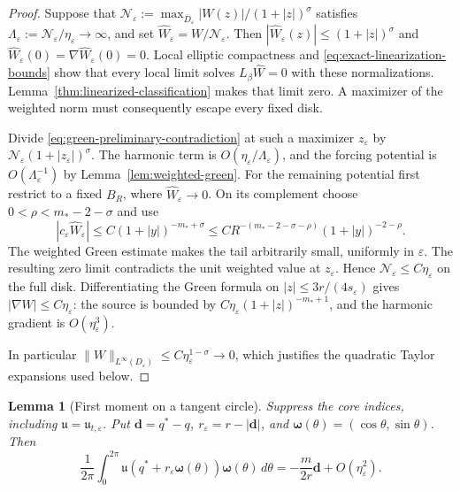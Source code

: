 \documentclass[11pt,reqno]{amsart}
\numberwithin{equation}{section}
\newtheorem{lemma}[theorem]{Lemma}
\theoremstyle{definition}
\theoremstyle{remark}
\newcommand{\eps}{\varepsilon}
\newcommand{\etae}{\eta_{\eps}}
\begin{document}
\begin{proof}
Suppose that $\mathcal N_\eps:=\max_{\overline D_\eps}
|W(z)|/(1+|z|)^\sigma$ satisfies
$\Lambda_\eps:=\mathcal N_\eps/\etae\to\infty$, and set
$\widehat W_\eps=W/\mathcal N_\eps$. Then
$|\widehat W_\eps(z)|\le(1+|z|)^\sigma$ and
$\widehat W_\eps(0)=\nabla\widehat W_\eps(0)=0$.
Local elliptic compactness and \eqref{eq:exact-linearization-bounds}
show that every local limit solves $L_\beta\widehat W=0$ with these
normalizations. Lemma~\ref{thm:linearized-classification} makes
that limit zero. A maximizer of the weighted norm must consequently
escape every fixed disk.

Divide \eqref{eq:green-preliminary-contradiction} at such a maximizer
$z_\eps$ by $\mathcal N_\eps(1+|z_\eps|)^\sigma$. The harmonic term is
$O(\etae/\Lambda_\eps)$, and the forcing potential is
$O(\Lambda_\eps^{-1})$ by Lemma~\ref{lem:weighted-green}. For the
remaining potential first restrict to a fixed $B_R$, where
$\widehat W_\eps\to0$. On its complement choose
$0<\rho<m_*-2-\sigma$ and use
\[
 |c_\eps\widehat W_\eps|
 \le C(1+|y|)^{-m_*+\sigma}
 \le C R^{-(m_*-2-\sigma-\rho)}(1+|y|)^{-2-\rho}.
\]
The weighted Green estimate makes the tail arbitrarily small,
uniformly in $\eps$. The resulting zero limit contradicts the unit
weighted value at $z_\eps$. Hence $\mathcal N_\eps\le C\etae$ on the full
disk. Differentiating the Green formula on $|z|\le3r/(4s_\eps)$ gives
$|\nabla W|\le C\etae$: the source is bounded by
$C\etae(1+|z|)^{-m_*+1}$, and the harmonic gradient is $O(\etae^3)$.

In particular $\|W\|_{L^\infty(D_\eps)}
\le C\etae^{1-\sigma}\to0$, which justifies the quadratic Taylor
expansions used below.
\end{proof}

\begin{lemma}[First moment on a tangent circle]\label{lem:first-moment}
Suppress the core indices, including $\mathfrak u=\mathfrak u_{t,\eps}$.
Put $\mathbf{d}=q^*-q$, $r_\eps=r-|\mathbf{d}|$, and
$\boldsymbol\omega(\theta)=(\cos\theta,\sin\theta)$.
Then
\begin{equation}\label{eq:first-moment-coarse}
 \frac1{2\pi}\int_0^{2\pi}\mathfrak u(q^*+r_\eps \boldsymbol\omega(\theta))\boldsymbol\omega(\theta)\,d\theta
 =-\frac{m}{2r}\mathbf{d}+O(\etae^2).
\end{equation}
\end{lemma}
\end{document}
